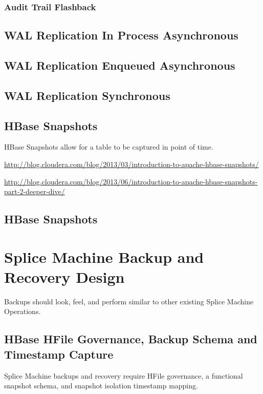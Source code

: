\subsubsection{Audit Trail Flashback}

\subsection{WAL Replication In Process Asynchronous }

\subsection{WAL Replication Enqueued Asynchronous }

\subsection{WAL Replication Synchronous }

\subsection{HBase Snapshots}

HBase Snapshots allow for a table to be captured in point of time.

\url{http://blog.cloudera.com/blog/2013/03/introduction-to-apache-hbase-snapshots/}

\url{http://blog.cloudera.com/blog/2013/06/introduction-to-apache-hbase-snapshots-part-2-deeper-dive/}

\subsection{HBase Snapshots}

\section{Splice Machine Backup and Recovery Design}

Backups should look, feel, and perform similar to other existing Splice Machine
Operations.

\subsection{HBase HFile Governance, Backup Schema and Timestamp Capture}

Splice Machine backups and recovery require HFile governance, a functional
snapshot schema, and snapshot isolation timestamp mapping.

